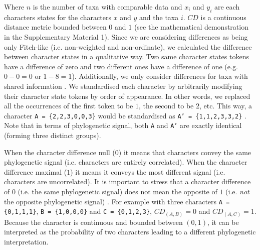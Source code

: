 \documentclass[12pt,letterpaper]{article}
\begin{document}
\noindent Where $n$ is the number of taxa with comparable data and $x_i$ and $y_i$ are each characters states for the characters $x$ and $y$ and the taxa $i$.
$CD$ is a continuous distance metric bounded between $0$ and $1$ (see the mathematical demonstration in the Supplementary Material 1).
Since we are considering differences as being only Fitch-like (i.e. non-weighted and non-ordinate), we calculated the difference between character states in a qualitative way.
Two same character states tokens have a difference of zero and two different ones have a difference of one (e.g. $0 - 0 = 0$ or $1 - 8 = 1$).
Additionally, we only consider differences for taxa with shared information \citep[i.e. a Gower distance;][]{GowerDist}.
We standardised each character by arbitrarily modifying their character state tokens by order of appearance.
In other words, we replaced all the occurrences of the first token to be $1$, the second to be $2$, etc.
This way, a character \texttt{A = \{2,2,3,0,0,3\}} would be standardised as \texttt{A' = \{1,1,2,3,3,2\}} \citep[following the \textit{xyz} notation in][p.13]{felsenstein2004inferring}.
Note that in terms of phylogenetic signal, both \texttt{A} and \texttt{A'} are exactly identical (forming three distinct groups).

When the character difference null ($0$) it means that characters convey the same phylogenetic signal (i.e. characters are entirely correlated).
When the character difference maximal ($1$) it means it conveys the most different signal (i.e. characters are uncorrelated).
It is important to stress that a character difference of $0$ (i.e. the same phylogenetic signal) does not mean the opposite of $1$ (i.e. \textit{not} the opposite phylogenetic signal) .
For example with three characters \texttt{A = \{0,1,1,1\}}, \texttt{B = \{1,0,0,0\}} and \texttt{C = \{0,1,2,3\}}, $CD_{(A,B)} = 0$ and $CD_{(A,C)} = 1$.
Because the character is continuous and bounded between $(0,1)$, it can be interpreted as the probability of two characters leading to a different phylogenetic interpretation.
\end{document}
